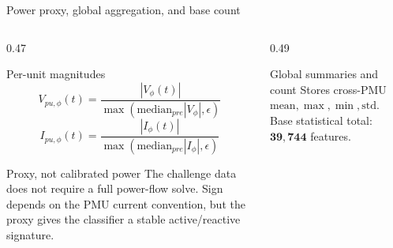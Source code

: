 \documentclass[aspectratio=169,10pt,t]{beamer}
\begin{document}
\fi
\begin{frame}{Power proxy, global aggregation, and base count}
\scriptsize
\begin{columns}[T,totalwidth=\textwidth]
\begin{column}{0.47\textwidth}
\begin{block}{Per-unit magnitudes}
\[
V_{pu,\phi}(t)=
\frac{|V_{\phi}(t)|}
{\max(\mathrm{median}_{pre}|V_{\phi}|,\epsilon)}
\]
\[
I_{pu,\phi}(t)=
\frac{|I_{\phi}(t)|}
{\max(\mathrm{median}_{pre}|I_{\phi}|,\epsilon)}
\]
\end{block}
\begin{alertblock}{Proxy, not calibrated power}
The challenge data does not require a full power-flow solve. Sign depends on the PMU current convention, but the proxy gives the classifier a stable active/reactive signature.
\end{alertblock}
\end{column}
\begin{column}{0.49\textwidth}
\centering
{}
\vspace{-1mm}
\begin{exampleblock}{Global summaries and count}
Stores cross-PMU \(\mathrm{mean},\max,\min,\mathrm{std}\). Base statistical total: \(\mathbf{39{,}744}\) features.
\end{exampleblock}
\end{column}
\end{columns}
\end{frame}

\end{document}
